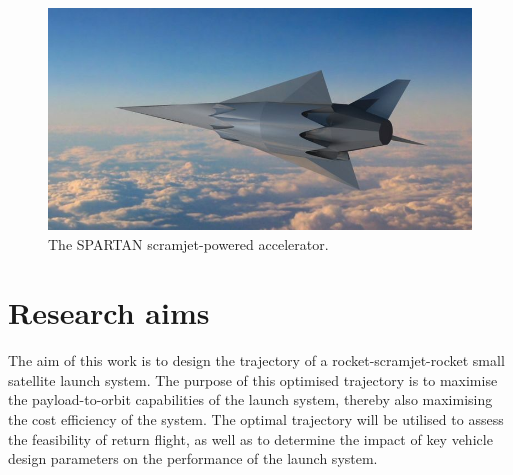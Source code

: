   	  	\begin{figure}[ht]
  	  		\centering
  	  		\includegraphics[width=0.7\linewidth]{figures/1_introduction/project-spartan}
  	  		\caption{The SPARTAN scramjet-powered accelerator\cite{BBC}.}
  	  		\label{fig:project-spartan}
  	  	\end{figure}
  	  	
  	  	

  \section{Research aims}

    The aim of this work is to design the trajectory of a rocket-scramjet-rocket small satellite launch system. The purpose of this optimised trajectory is to maximise the payload-to-orbit capabilities of the launch system, thereby also maximising the cost efficiency of the system. The optimal trajectory will be utilised to assess the feasibility of return flight, as well as to determine the impact of key vehicle design parameters on the performance of the launch system. 
 
